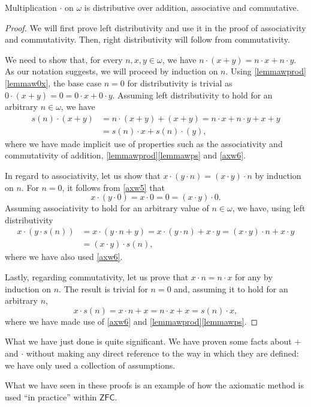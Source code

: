 \begin{proposition}
Multiplication $\cdot$ on $\omega$ is distributive over addition, associative and commutative.
\label{<+label+>}
\end{proposition}

\begin{proof}
We will first prove left distributivity and use it in the proof of associativity and commutativity.
Then, right distributivity will follow from commutativity.

We need to show that, for every $n,x,y\in \omega$, we have $n\cdot (x+y) = n\cdot x + n\cdot y$.
As our notation suggests, we will proceed by induction on $n$. Using \ref{lemmawprod}\ref{lemmaw0x}, the base case $n=0$ for distributivity is trivial as $0\cdot (x+y) = 0 = 0\cdot x + 0\cdot y$.
Assuming left distributivity to hold for an arbitrary $n\in \omega$, we have
\begin{align*}
s(n) \cdot (x + y) &= n\cdot(x+y) + (x+y) = n\cdot x + n\cdot y + x + y \\
&= s(n) \cdot x + s(n) \cdot (y),
\end{align*}
where we have made implicit use of properties such as the associativity and commutativity of addition, \ref{lemmawprod}\ref{lemmawps} and \ref{axw6}.

In regard to associativity, let us show that $x\cdot(y \cdot n) = (x\cdot y) \cdot n$ by induction on $n$. For $n=0$, it follows from \ref{axw5} that 
\[ x \cdot (y \cdot 0) = x\cdot 0 = 0 = (x\cdot y)\cdot 0.\]
Assuming associativity to hold for an arbitrary value of $n\in \omega$, we have, using left distributivity 
\begin{align*}
x\cdot (y\cdot s(n) ) &= x\cdot (y \cdot n + y) = x \cdot (y \cdot n) + x \cdot y = (x\cdot y)\cdot n + x\cdot y \\
&= (x\cdot y) \cdot s(n),
\end{align*}
where we have also used \ref{axw6}.

Lastly, regarding commutativity, let us prove that $x \cdot n = n \cdot x$ for any by induction on $n$. The result is trivial for $n = 0$ and, assuming it to hold for an arbitrary $n$,
\[ x \cdot s(n) = x \cdot n + x = n \cdot x + x = s(n) \cdot x,\]
where we have made use of \ref{axw6} and \ref{lemmawprod}\ref{lemmawps}.
\end{proof}

\begin{para}
What we have just done is quite significant. We have proven some facts about $+$ and $\cdot$ without making any direct reference to the way in which they are defined: we have only used a collection of assumptions.

What we have seen in these proofs is an example of how the axiomatic method is used ``in practice'' within $\mathsf{ZFC}$.
\end{para}

